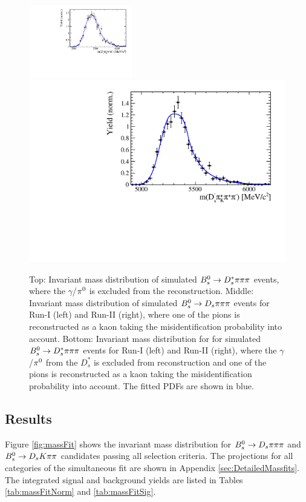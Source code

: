 \begin{figure}[b]
\includegraphics[height=!,width=0.4\textwidth]{figs/MassFit/BkgShape/Bs2Dsstarpipipi_as_DsKpipi_Run1.pdf}
\includegraphics[height=!,width=0.4 \textwidth]{figs/MassFit/BkgShape/Bs2Dsstarpipipi_as_DsKpipi_Run2.pdf}
\caption{
Top: Invariant mass distribution of simulated ${{B}^0_{s}}\rightarrow D_s^{*}{\pi}{\pi}{\pi}$ events, where the $\gamma$/${{\pi}^0}$ is excluded from the reconstruction. 
Middle: Invariant mass distribution of  simulated ${{B}^0_{s}}\rightarrow{\ensuremath{{D}_{s}}}{\ensuremath{\pi}}{\ensuremath{\pi}}{\ensuremath{\pi}}$ events for Run-I (left) and Run-II (right), where one of the pions is reconstructed as a kaon taking the misidentification probability into account. 
Bottom: Invariant mass distribution for for simulated ${{B}^0_{s}}\rightarrow D_s^{*}{\pi}{\pi}{\pi}$ events for Run-I (left) and Run-II (right), where the $\gamma$/${{\pi}^0}$ from the $D_s^{*}$ is excluded from reconstruction
and one of the pions is reconstructed as a kaon taking the misidentification probability into account. 
The fitted PDFs are shown in blue.}
\label{fig:bgkShapes}
\end{figure}
 
\clearpage
\subsection{Results}
\label{subsec:Results}

Figure \ref{fig:massFit} shows the invariant mass distribution for ${{B}^0_{s}}\rightarrow{\ensuremath{{D}_{s}}}{\ensuremath{\pi}}{\ensuremath{\pi}}{\ensuremath{\pi}}$ and  ${{B}^0_{s}}\rightarrow{\ensuremath{{D}_{s}}}{\ensuremath{K}}{\ensuremath{\pi}}{\ensuremath{\pi}}$ candidates passing all selection criteria.
The projections for all categories of the simultaneous fit are shown in Appendix \ref{sec:DetailedMassfits}. %
The integrated signal and background yields are listed in Tables \ref{tab:massFitNorm} and \ref{tab:massFitSig}.

